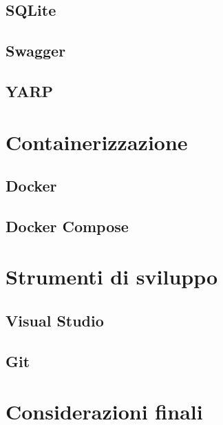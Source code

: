\subsection{SQLite}
\subsection{Swagger}
\subsection{YARP}
\section{Containerizzazione}
\subsection{Docker}
\subsection{Docker Compose}
\section{Strumenti di sviluppo}
\subsection{Visual Studio}
\subsection{Git}
\section{Considerazioni finali}












%
%




